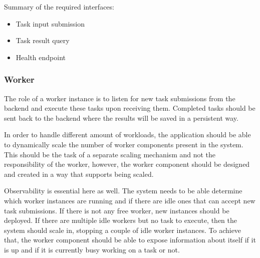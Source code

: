 Summary of the required interfaces: \begin{itemize}
	\item Task input submission
	\item Task result query
	\item Health endpoint
\end{itemize}

\subsubsection{Worker} \label{design-worker}

%

The role of a worker instance is to listen for new task submissions from the backend and execute these tasks upon receiving them. Completed tasks should be sent back to the backend where the results will be saved in a persistent way.

In order to handle different amount of workloads, the application should be able to dynamically scale the number of worker components present in the system. This should be the task of a separate scaling mechanism and not the responsibility of the worker, however, the worker component should be designed and created in a way that supports being scaled.

Observability is essential here as well. The system needs to be able determine which worker instances are running and if there are idle ones that can accept new task submissions. If there is not any free worker, new instances should be deployed. If there are multiple idle workers but no task to execute, then the system should scale in, stopping a couple of idle worker instances. To achieve that, the worker component should be able to expose information about itself if it is up and if it is currently busy working on a task or not.



